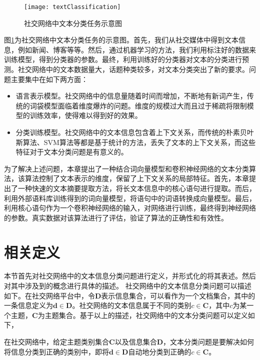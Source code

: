 \begin{figure}[!htbp]
  \centering
  \texttt{[image: textClassification]}
  \caption{社交网络中文本分类任务示意图}
  \label{fig:textClassification}
\end{figure}

图\ref{fig:textClassification}为社交网络中文本分类任务的示意图。首先，我们从社交媒体中得到文本信息，例如新闻、博客等等。然后，通过机器学习的方法，我们利用标注好的数据来训练模型，得到分类器的参数。最终，利用训练好的分类器对文本的分类进行预测。社交网络中的文本数据量大，话题种类较多，对文本分类突出了新的要求。问题主要集中在如下两方面：
\begin{itemize}
  \item 语言表示模型。社交网络中的信息量随着时间而增加，不断地有新词产生，传统的词袋模型面临着维度爆炸的问题。维度的规模过大而且过于稀疏将限制模型的训练效率，使得难以得到好的效果。
  \item 分类训练模型。社交网络中的文本信息包含着上下文关系，而传统的朴素贝叶斯算法、SVM算法等都是基于统计的方法，丢失了文本的上下文关系，而这些特征对于文本分类问题是有意义的。
\end{itemize}

为了解决上述问题，本章提出了一种结合词向量模型和卷积神经网络的文本分类算法，该算法控制了文本表示的维度，保留了上下文关系的局部特征。首先，本章提出了一种快速的文本摘要提取方法，将长文本信息中的核心语句进行提取。而后，利用外部语料库训练得到的词向量模型，将语句中的词语转换成向量模型。最后，利用核心语句作为一个卷积神经网络的输入，对网络进行训练，最终得到神经网络的参数。真实数据对该算法进行了评估，验证了算法的正确性和有效性。

\section{相关定义}
\label{sec3:definition}
本节首先对社交网络中的文本信息分类问题进行定义，并形式化的将其表述。然后对其中涉及到的概念进行具体的描述。
社交网络中的文本信息分类问题可以描述如下。在社交网络平台中，令$\mathbf{D}$表示信息集合，可以看作为一个文档集合，其中的一条信息定义为$\mathbf{d} \in \mathbf{D}$。社交网络的文本信息属于不同的类别$c \in \mathbf{C}$，其中$c$为某一个主题，$\mathbf{C}$为主题集合。基于以上的描述，社交网络中的文本分类问题可以定义如下，
\begin{defn}[文本分类问题]\label{def:textClassification}
在社交网络中，给定主题类别集合$\mathbf{C}$以及信息集合$\mathbf{D}$，文本分类问题是要解决如何将信息分类到正确的类别中，即将$\mathbf{d} \in \mathbf{D}$自动地分类到正确的$c \in \mathbf{C}$。
\end{defn}

